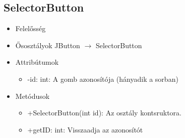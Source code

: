 \subsection{SelectorButton}
\begin{itemize}
	\item Felelősség\newline
	\item Ősosztályok\newline
		JButton $\rightarrow$ SelectorButton
	\item Attribútumok
	\begin{itemize}
		\item -id: int: A gomb azonosítója (hányadik a sorban)
	\end{itemize}
	\item Metódusok
	\begin{itemize}
		\item +SelectorButton(int id): Az osztály kontsruktora.
		\item +getID: int: Visszaadja az azonosítót
	\end{itemize}
\end{itemize}






